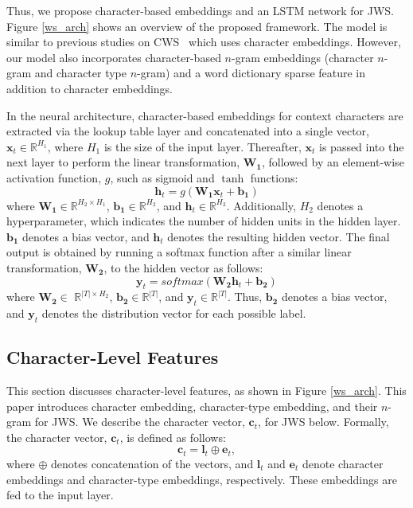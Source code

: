 \documentclass[11pt]{article}
\begin{document}
Thus, we propose character-based embeddings and an LSTM network for JWS.
Figure \ref{ws_arch} shows an overview of the proposed framework. The model is
similar to previous studies on CWS~\cite{chen-EtAl:2015:EMNLP2} which uses
character embeddings. However, our model also incorporates character-based
$n$-gram embeddings (character $n$-gram and character type $n$-gram) and a
word dictionary sparse feature in addition to character embeddings.

In the neural architecture, character-based embeddings for context characters
are extracted via the lookup table layer and concatenated into a single
vector,
$\bm{x}_t \in \mathbb{R}^{H_{1}}$, where $H_{1}$ is the size of the input layer. 
Thereafter, $\bm{x}_t$ is passed into the next layer to perform the linear
transformation, $\bm{W_{1}}$,  followed by an element-wise activation
function, $g$, such as sigmoid and $\tanh$ functions:
\begin{equation}
\label{ffnn_h}
 \bm{h}_t = g(\bm{W_{1}}\bm{x}_t + \bm{b_{1}})
\end{equation}
where $\bm{W_1} \in \mathbb{R}^{H_{2} \times H_{1}}$,
$\bm{b_{1}} \in \mathbb{R}^{H_{2}}$, and $\bm{h}_t \in \mathbb{R}^{H_{2}}$. 
Additionally, $H_{2}$ denotes a hyperparameter, which indicates the number of
hidden units in the hidden layer. $\bm{b_{1}}$ denotes a bias vector, and
$\bm{h}_t$ denotes the resulting hidden vector. The final output is obtained
by running a softmax function after a similar linear transformation,
$\bm{W_2}$, to the hidden vector as follows:
\begin{equation}
 \bm{y}_t = \mathit{softmax}(\bm{W_{2}}\bm{h}_t + \bm{b_{2}})
\end{equation}
where $\bm{W_2}$$\in$ $\mathbb{R}^{|T| \times H_{2}}$,
$\bm{b_{2}}\in\mathbb{R}^{|T|}$, and $\bm{y}_t \in \mathbb{R}^{|T|}$. Thus,
$\bm{b_{2}}$ denotes a bias vector, and $\bm{y}_t$  denotes the distribution
vector for each possible label.


\subsection{Character-Level Features}
This section discusses character-level features, as shown in Figure
\ref{ws_arch}. This paper introduces character embedding, character-type
embedding, and their $n$-gram for JWS. We describe the character vector,
$\bm{c}_t$, for JWS below. Formally, the character vector, $\bm{c}_t$,
is defined as follows:
\begin{equation}
\bm{c}_t = \bm{l}_t \oplus \bm{e}_t,
\end{equation}
where $\oplus$ denotes concatenation of the vectors, and $\bm{l}_t$ and
$\bm{e}_t$ denote character embeddings and character-type embeddings,
respectively. These embeddings are fed to the input layer.
\end{document}
